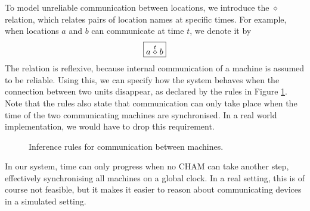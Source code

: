 To model unreliable communication between locations, we introduce the
$\diamond$ relation, which relates pairs of location names at specific times.
For example, when locations $a$ and $b$ can
communicate at time $t$, we denote it by
\begin{equation*}
 \boxed{a \stackrel{t}{\diamond} b}
\end{equation*}
The relation is reflexive, because internal communication of a machine is
assumed to be reliable. Using this, we can specify how the system behaves when
the connection between two units disappear, as declared by the rules in Figure
\ref{fig:rule:coms}. Note that the rules also state that communication can only
take place when the time of the two communicating machines are synchronised. In
a real world implementation, we would have to drop this requirement.
\begin{figure}[!h]
\caption{Inference rules for communication between machines.}\label{fig:rule:coms}
\end{figure}

In our system, time can only progress when no CHAM can take another step,
effectively synchronising all machines on a global clock. In a real setting,
this is of course not feasible, but it makes it easier to reason about
communicating devices in a simulated setting.

